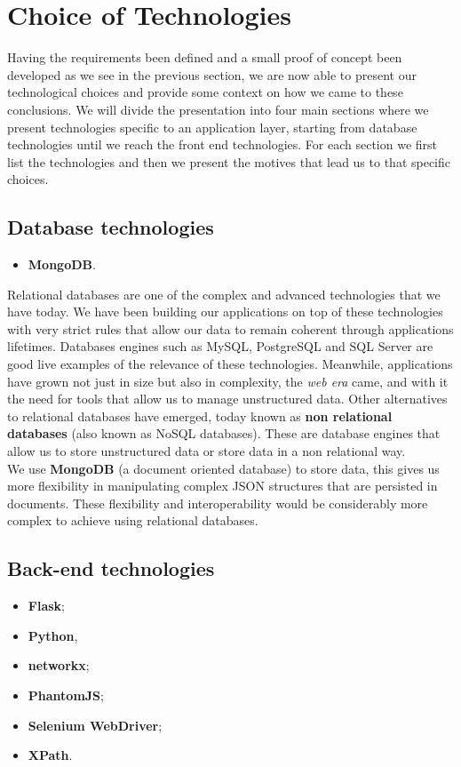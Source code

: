 \section{Choice of Technologies}
Having the requirements been defined and a small proof of concept been developed as we see in the previous section, we are now able to present our technological choices and provide some context on how we came to these conclusions. We will divide the presentation into four main sections where we present technologies specific to an application layer, starting from database technologies until we reach the front end technologies. For each section we first list the technologies and then we present the motives that lead us to that specific choices.

\subsection{Database technologies}
\begin{itemize}
    \item \textbf{MongoDB}.
\end{itemize}

Relational databases are one of the complex and advanced technologies that we have today. We have been building our applications on top of these technologies with very strict rules that allow our data to remain coherent through applications lifetimes. Databases engines such as MySQL, PostgreSQL and SQL Server are good live examples of the relevance of these technologies. Meanwhile, applications have grown not just in size but also in complexity, the \textit{web era} came, and with it the need for tools that allow us to manage unstructured data. Other alternatives to relational databases have emerged, today known as \textbf{non relational databases} (also known as NoSQL databases). These are database engines that allow us to store unstructured data or store data in a non relational way.\\
\indent We use \textbf{MongoDB} \citep{mongodb} (a document oriented database) to store data, this gives us more flexibility in manipulating complex JSON structures that are persisted in documents. These flexibility and interoperability would be considerably more complex to achieve using relational databases.

\subsection{Back-end technologies}
\begin{itemize}
    \item \textbf{Flask};
    \item \textbf{Python},
    \item \textbf{networkx};
    \item \textbf{PhantomJS};
    \item \textbf{Selenium WebDriver};
    \item \textbf{XPath}.
\end{itemize}

